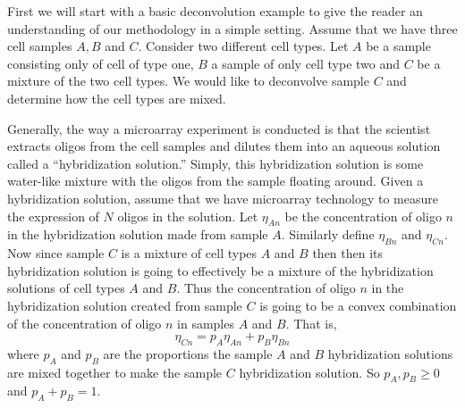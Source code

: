 \documentclass[reqno,12pt,oneside]{report}\usepackage[]{graphicx}\usepackage[]{color}
\theoremstyle{plain}
\theoremstyle{definition}
\theoremstyle{remark}
\numberwithin{theorem}{chapter}     %
\begin{document}
First we will start with a basic deconvolution example to give the reader an understanding of our methodology in a simple setting. Assume that we have three cell samples $A,B$ and $C$. Consider two different cell types. Let $A$ be a sample consisting only of cell of type one, $B$ a sample of only cell type two and $C$ be a mixture of the two cell types. We would like to deconvolve sample $C$ and determine how the cell types are mixed. 

Generally, the way a microarray experiment is conducted is that the scientist extracts oligos from the cell samples and dilutes them into an aqueous solution called a ``hybridization solution.'' Simply, this hybridization solution is some water-like mixture with the oligos from the sample floating around. Given a hybridization solution, assume that we have microarray technology to measure the expression of $N$ oligos in the solution. Let $\eta_{An}$ be the concentration of oligo $n$ in the hybridization solution made from sample $A$. Similarly define $\eta_{Bn}$ and $\eta_{Cn}$. Now since sample $C$ is a mixture of cell types $A$ and $B$ then then its hybridization solution is going to effectively be a mixture of the hybridization solutions of cell types $A$ and $B$. Thus the concentration of oligo $n$ in the hybridization solution created from sample $C$ is going to be a convex combination of the concentration of oligo $n$ in samples $A$ and $B$. That is, 
\[
\eta_{Cn} = p_A\eta_{An} + p_B\eta_{Bn}
\]
where $p_A$ and $p_B$ are the proportions the sample $A$ and $B$ hybridization solutions are mixed together to make the sample $C$ hybridization solution. So $p_A,p_B\geq 0$ and $p_A+p_B = 1$. 
\end{document}
